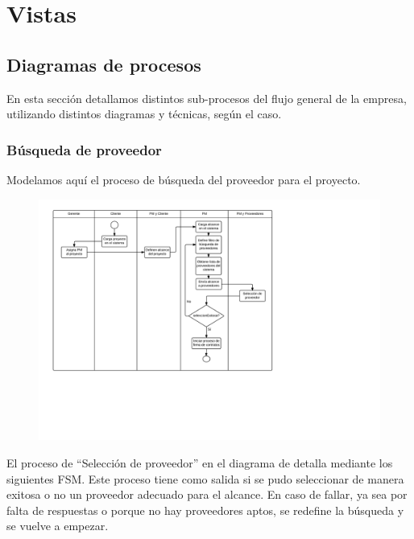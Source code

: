 \section{Vistas}




	\subsection{Diagramas de procesos}

En esta sección detallamos distintos sub-procesos del flujo general de la empresa, 
utilizando distintos diagramas y técnicas, según el caso. 

		\subsubsection{Búsqueda de proveedor}
Modelamos aquí el proceso de búsqueda del proveedor para el proyecto. 
\begin{figure}[H]
\includegraphics[width=\linewidth]{diag/nuevos/act-busqprov.png}
\label{act-busqprov}
\end{figure}

El proceso de ``Selección de proveedor'' en el diagrama de detalla mediante 
los siguientes FSM. Este proceso tiene como salida si se pudo seleccionar de 
manera exitosa o no un proveedor adecuado para el alcance. En caso de fallar, ya sea 
por falta de respuestas o porque no hay proveedores aptos, se redefine la búsqueda y 
se vuelve a empezar. 

